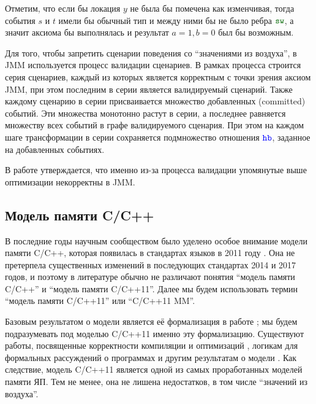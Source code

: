 Отметим, что если бы локация $y$ не была бы помечена как изменчивая, тогда события $s$ и $t$ имели бы
обычный тип и между ними бы не было ребра $\lSW$, а значит аксиома бы выполнялась и результат $a = 1, b = 0$
был бы возможным.



Для того, чтобы запретить сценарии поведения со ``значениями из воздуха'', в JMM используется процесс
валидации сценариев.
В рамках процесса строится серия сценариев, каждый из которых является корректным с точки зрения аксиом JMM,
при этом последним в серии является валидируемый сценарий.
Также каждому сценарию в серии присваивается множество добавленных (committed) событий.
Эти множества монотонно растут в серии, а последнее равняется множеству всех событий в графе валидируемого сценария.
При этом на каждом шаге трансформации в серии сохраняется подмножество отношения $\lHB$, заданное на добавленных
событиях.

В работе \cite{Sevcik-Aspinall:ECOOP08} утверждается, что именно из-за процесса валидации упомянутые выше оптимизации
некорректны в JMM.

\subsection{Модель памяти C/C++}
\label{sec:cppmodel}
В последние годы научным сообществом было уделено особое внимание модели памяти C/C++,
которая появилась в стандартах языков в 2011 году \cite{C:11,CPP:11}.
Она не претерпела существенных изменений в последующих стандартах 2014 \cite{CPP:14} и 2017 \cite{CPP:17} годов,
и поэтому в литературе обычно не различают понятия ``модель памяти C/C++'' и ``модель памяти C/C++11''.
Далее мы будем использовать термин ``модель памяти C/C++11'' или ``C/C++11 MM''.

Базовым результатом о модели является её формализация в работе \cite{Batty-al:POPL11};
мы будем подразумевать под моделью C/C++11 именно эту формализацию.
Существуют работы, посвященные корректности компиляции и оптимизаций
\cite{Batty-al:POPL12,Vafeiadis-al:POPL15,Chakraborty-Vafeiadis:CGO16,Lahav-al:PLDI17,Batty-al:POPL16},
логикам для формальных рассуждений о программах
\cite{Turon-al:OOPSLA14,Vafeiadis-Narayan:OOPSLA13,Lahav-Vafeiadis:ICALP15,Doko-Vafeiadis:VMCAI16,Vafeiadis:CPP15}
и другим результатам о модели
\cite{Batty-al:POPL13,Batty-al:ESOP15,Lidbury-Donaldson:POPL17, Tassarotti-al:PLDI15,Doko-Vafeiadis:ESOP17}.
Как следствие, модель C/C++11 является одной из самых проработанных моделей памяти ЯП.
Тем не менее, она не лишена недостатков, в том числе ``значений из воздуха''.

